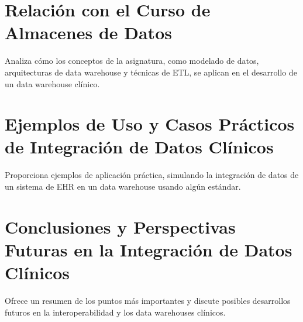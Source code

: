 \documentclass[12pt, a4paper, twoside]{article}
\begin{document}
	\section{Relación con el Curso de Almacenes de Datos}
	Analiza cómo los conceptos de la asignatura, como modelado de datos, arquitecturas de data warehouse y técnicas de ETL, se aplican en el desarrollo de un data warehouse clínico.
	
	\section{Ejemplos de Uso y Casos Prácticos de Integración de Datos Clínicos}
	Proporciona ejemplos de aplicación práctica, simulando la integración de datos de un sistema de EHR en un data warehouse usando algún estándar.
	
	\section{Conclusiones y Perspectivas Futuras en la Integración de Datos Clínicos}
	Ofrece un resumen de los puntos más importantes y discute posibles desarrollos futuros en la interoperabilidad y los data warehouses clínicos.
	
	
	
\end{document}
